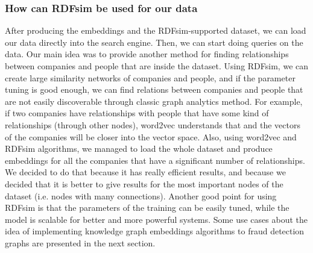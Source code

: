 \documentclass[sigconf, nonacm]{acmart}
\begin{document}
\subsubsection{How can RDFsim be used for our data} 
After producing the embeddings and the RDFsim-supported dataset, we can load our data directly into the search engine. Then, we can start doing queries on the data. Our main idea was to provide another method for finding relationships between companies and people that are inside the dataset. Using RDFsim, we can create large similarity networks of companies and people, and if the parameter tuning is good enough, we can find relations between companies and people that are not easily discoverable through classic graph analytics method. For example, if two companies have relationships with people that have some kind of relationships (through other nodes), word2vec understands that and the vectors of the companies will be closer into the vector space. Also, using word2vec and RDFsim algorithms, we managed to load the whole dataset and produce embeddings for all the companies that have a significant number of relationships. We decided to do that because it has really efficient results, and because we decided that it is better to give results for the most important nodes of the dataset (i.e. nodes with many connections). Another good point for using RDFsim is that the parameters of the training can be easily tuned, while the model is scalable for better and more powerful systems. Some use cases about the idea of implementing knowledge graph embeddings algorithms to fraud detection graphs are presented in the next section. 
\end{document}
